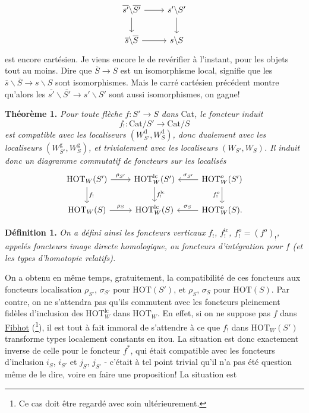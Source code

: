 \documentclass[11pt]{article}
\newcommand{\msp}[1]{\marginpar{\footnotesize [#1]}}
\newcommand{\HOT}{\mathrm{HOT}}
\newcommand{\Cat}{\mathrm{Cat}}
\begin{document}
\[
\begin{tikzcd}
\overline{s'}\backslash\overline{S'} \arrow[r] \arrow[d] & s'\backslash S' \arrow[d] \\
\overline{s}\backslash\overline{S} \arrow[r] & s\backslash S
\end{tikzcd}
\]
est encore
\msp{page 136}
cartésien. Je viens encore le de revérifier à l'instant, pour les objets tout au moins. Dire que $\overline{S}\longrightarrow S$ est un isomorphisme local, signifie que les $\overline{s}\backslash\overline{S}\longrightarrow s\backslash S$ sont isomorphismes. Mais le carré cartésien précédent montre qu'alors les $\overline{s'}\backslash\overline{S'}\longrightarrow s'\backslash S'$ sont aussi isomorphismes, on gagne! %

\textbf{Théorème 1.} \textit{Pour toute flèche $f:S'\longrightarrow S$ dans} Cat\textit{, le foncteur induit}
\[ f_! : \Cat/S' \longrightarrow \Cat/S \]
\textit{est compatible avec les localiseurs $(W_{S'}^{\mathrm{d}},W_S^{\mathrm{d}})$, donc dualement avec les localiseurs $(W_{S'}^{\mathrm{g}},W_S^{\mathrm{g}})$, et trivialement avec les localiseurs $(W_{S'},W_S)$. Il induit donc un diagramme commutatif de foncteurs sur les localisés}
\[
\begin{tikzcd}
\HOT_W(S') \arrow[r, "\rho_{S'}"] \arrow[d, "f_!"] & \HOT_W^{\mathrm{lc}}(S') \arrow[d, "f_!^{\mathrm{lc}}"] & \HOT_W^o(S') \arrow[l, "\sigma_{S'}"'] \arrow[d, "f_!^o"'] \\
\HOT_W(S) \arrow[r, "\rho_S"] & \HOT_W^{\mathrm{lc}}(S) & \HOT_W^o(S). \arrow[l, "\sigma_S"']
\end{tikzcd}
\]

\textbf{Définition 1.} \textit{On a défini ainsi les foncteurs verticaux $f_!$, $f_!^{\mathrm{lc}}$, $f_!^o=(f^o)_!$, appelés foncteurs image directe homologique, ou foncteurs d'intégration pour $f$ (et les types d'homotopie relatifs).}

\msp{page 137}
On a obtenu en même temps, gratuitement, la compatibilité de ces foncteurs aux foncteurs localisation $\rho_{S'}$, $\sigma_{S'}$ pour $\HOT(S')$, et $\rho_S$, $\sigma_S$ pour $\HOT(S)$. Par contre, on ne s'attendra pas qu'ils commutent avec les foncteurs pleinement fidèles d'inclusion des $\HOT_W^{\mathrm{lc}}$ dans $\HOT_W$. En effet, si on ne suppose pas $f$ dans \underline{Fibhot} (\footnote[67]{Ce cas doit être regardé avec soin ultérieurement.}), il est tout à fait immoral de s'attendre à ce que $f_!$ dans $\HOT_W(S')$ transforme types localement constants en itou. La situation est donc exactement inverse de celle pour le foncteur $f^*$, qui était compatible avec les foncteurs d'inclusion $i_S$, $i_{S'}$ et $j_S$, $j_{S'}$ - c'était à tel point trivial qu'il n'a pas été question même de le dire, voire en faire une proposition! La situation est
\end{document}
